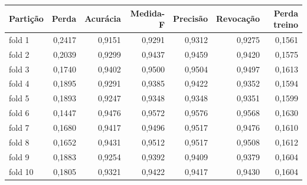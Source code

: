 \begin{tabular}{lrrrrrr}
\toprule
Partição & Perda & Acurácia & Medida-F & Precisão & Revocação & Perda treino \\
\midrule
fold 1 & 0,2417 & 0,9151 & 0,9291 & 0,9312 & 0,9275 & 0,1561 \\
fold 2 & 0,2039 & 0,9299 & 0,9437 & 0,9459 & 0,9420 & 0,1575 \\
fold 3 & 0,1740 & 0,9402 & 0,9500 & 0,9504 & 0,9497 & 0,1613 \\
fold 4 & 0,1895 & 0,9291 & 0,9385 & 0,9422 & 0,9352 & 0,1594 \\
fold 5 & 0,1893 & 0,9247 & 0,9348 & 0,9348 & 0,9351 & 0,1599 \\
fold 6 & 0,1447 & 0,9476 & 0,9572 & 0,9576 & 0,9568 & 0,1630 \\
fold 7 & 0,1680 & 0,9417 & 0,9496 & 0,9517 & 0,9476 & 0,1610 \\
fold 8 & 0,1652 & 0,9431 & 0,9512 & 0,9517 & 0,9508 & 0,1612 \\
fold 9 & 0,1883 & 0,9254 & 0,9392 & 0,9409 & 0,9379 & 0,1604 \\
fold 10 & 0,1805 & 0,9321 & 0,9422 & 0,9417 & 0,9430 & 0,1604 \\
\bottomrule
\end{tabular}
